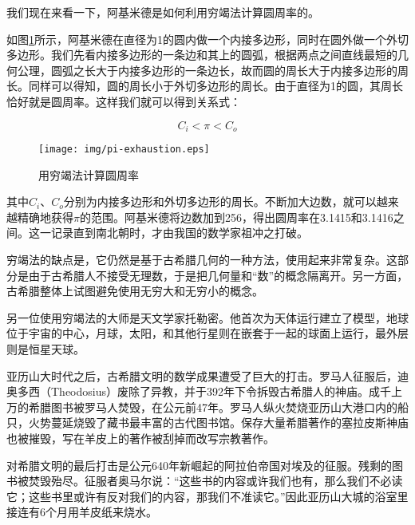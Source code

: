 \documentclass{article}
\begin{document}
我们现在来看一下，阿基米德是如何利用穷竭法计算圆周率的。

如图\ref{fig:pi-exhaustion}所示，阿基米德在直径为1的圆内做一个内接多边形，同时在圆外做一个外切多边形。我们先看内接多边形的一条边和其上的圆弧，根据两点之间直线最短的几何公理，圆弧之长大于内接多边形的一条边长，故而圆的周长大于内接多边形的周长。同样可以得知，圆的周长小于外切多边形的周长。由于直径为1的圆，其周长恰好就是圆周率。这样我们就可以得到关系式：

\[
  C_i < \pi < C_o
\]

\begin{figure}[htbp]
 \centering
 \texttt{[image: img/pi-exhaustion.eps]}
 \caption{用穷竭法计算圆周率}
 \label{fig:pi-exhaustion}
\end{figure}

其中$C_i$、$C_o$分别为内接多边形和外切多边形的周长。不断加大边数，就可以越来越精确地获得$\pi$的范围。阿基米德将边数加到256，得出圆周率在3.1415和3.1416之间。这一记录直到南北朝时，才由我国的数学家祖冲之打破。

穷竭法的缺点是，它仍然是基于古希腊几何的一种方法，使用起来非常复杂。这部分是由于古希腊人不接受无理数，于是把几何量和“数”的概念隔离开。另一方面，古希腊整体上试图避免使用无穷大和无穷小的概念。

另一位使用穷竭法的大师是天文学家托勒密。他首次为天体运行建立了模型，地球位于宇宙的中心，月球，太阳，和其他行星则在嵌套于一起的球面上运行，最外层则是恒星天球。

亚历山大时代之后，古希腊文明的数学成果遭受了巨大的打击。罗马人征服后，迪奥多西（Theodosius）废除了异教，并于392年下令拆毁古希腊人的神庙。成千上万的希腊图书被罗马人焚毁，在公元前47年。罗马人纵火焚烧亚历山大港口内的船只，火势蔓延烧毁了藏书最丰富的古代图书馆。保存大量希腊著作的塞拉皮斯神庙也被摧毁，写在羊皮上的著作被刮掉而改写宗教著作。

对希腊文明的最后打击是公元640年新崛起的阿拉伯帝国对埃及的征服。残剩的图书被焚毁殆尽。征服者奥马尔说：“这些书的内容或许我们也有，那么我们不必读它；这些书里或许有反对我们的内容，那我们不准读它。”因此亚历山大城的浴室里接连有6个月用羊皮纸来烧水\cite{M-Kline-2007}。
\end{document}
